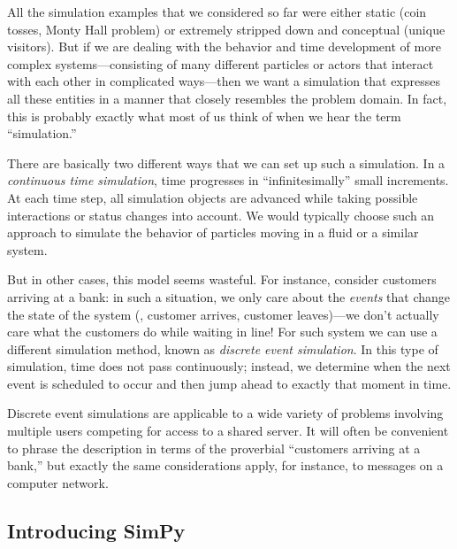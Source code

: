   
All the simulation examples that we considered so far were either
static (coin tosses, Monty Hall problem) or extremely stripped down
and conceptual (unique visitors).  But if we are dealing with the
behavior and time development of more complex systems---\break consisting of
many different particles or actors that interact with each other in
complicated ways---then we want a simulation that expresses all these
entities in a manner that closely resembles the problem domain. In
fact, this is probably exactly what most of us think of when we hear
the term ``simulation.''

There are basically two different ways that we can set up such a
simulation. In a \emph{continuous time simulation},  time progresses in
``infinitesimally''\vadjust{\pagebreak} small increments. At each time step, all
simulation objects are advanced while taking possible interactions or
status changes into account. We would typically choose such an
approach to simulate the behavior of particles moving in a fluid or a
similar system.

But in other cases, this model seems wasteful. For instance, consider
customers arriving at a bank: in such a situation, we only care about
the \emph{events} that change the state of the system (\eg, customer
arrives, customer leaves)---we don't actually care what the customers
do while waiting in line! For such system we can use a different
simulation method, known as \emph{discrete event simulation}.  In this
type of simulation, time does not pass continuously; instead, we
determine when the next event is scheduled to occur and then jump
ahead to exactly that moment in time.

\enlargethispage{6pt}

Discrete event simulations are applicable to a wide variety of
problems involving multiple users competing for access to a shared
server.  It will often be convenient to phrase the description in
terms of the proverbial ``customers arriving at a bank,'' but exactly
the same considerations apply, for instance, to messages on a computer
network.


\vspace*{-6pt}
\subsection{Introducing SimPy}

